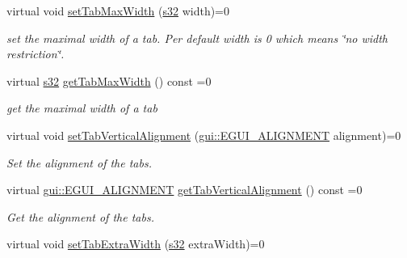 \begin{DoxyCompactItemize}
\mbox{\label{classirr_1_1gui_1_1IGUITabControl_a854b4d28fda5b9eb0ccc2f6a8c8e463c}} 
virtual void \hyperlink{classirr_1_1gui_1_1IGUITabControl_a854b4d28fda5b9eb0ccc2f6a8c8e463c}{set\+Tab\+Max\+Width} (\hyperlink{namespaceirr_ac66849b7a6ed16e30ebede579f9b47c6}{s32} width)=0
\begin{DoxyCompactList}\small\item\em set the maximal width of a tab. Per default width is 0 which means \char`\"{}no width restriction\char`\"{}. \end{DoxyCompactList}\item 
\mbox{\label{classirr_1_1gui_1_1IGUITabControl_a6f5c5210417d07c3f87ce2db91341f3c}} 
virtual \hyperlink{namespaceirr_ac66849b7a6ed16e30ebede579f9b47c6}{s32} \hyperlink{classirr_1_1gui_1_1IGUITabControl_a6f5c5210417d07c3f87ce2db91341f3c}{get\+Tab\+Max\+Width} () const =0
\begin{DoxyCompactList}\small\item\em get the maximal width of a tab \end{DoxyCompactList}\item 
virtual void \hyperlink{classirr_1_1gui_1_1IGUITabControl_a5481d1c15605d00654c12581842ad311}{set\+Tab\+Vertical\+Alignment} (\hyperlink{namespaceirr_1_1gui_a19eb5fb40e67f108cb16aba922ddaa2d}{gui\+::\+E\+G\+U\+I\+\_\+\+A\+L\+I\+G\+N\+M\+E\+NT} alignment)=0
\begin{DoxyCompactList}\small\item\em Set the alignment of the tabs. \end{DoxyCompactList}\item 
virtual \hyperlink{namespaceirr_1_1gui_a19eb5fb40e67f108cb16aba922ddaa2d}{gui\+::\+E\+G\+U\+I\+\_\+\+A\+L\+I\+G\+N\+M\+E\+NT} \hyperlink{classirr_1_1gui_1_1IGUITabControl_a3153a7dba26548eda6a8013e1e669c18}{get\+Tab\+Vertical\+Alignment} () const =0
\begin{DoxyCompactList}\small\item\em Get the alignment of the tabs. \end{DoxyCompactList}\item 
\mbox{\label{classirr_1_1gui_1_1IGUITabControl_ab73b93ca48aabf376c4b10cf42db35d7}} 
virtual void \hyperlink{classirr_1_1gui_1_1IGUITabControl_ab73b93ca48aabf376c4b10cf42db35d7}{set\+Tab\+Extra\+Width} (\hyperlink{namespaceirr_ac66849b7a6ed16e30ebede579f9b47c6}{s32} extra\+Width)=0

\end{DoxyCompactItemize}
